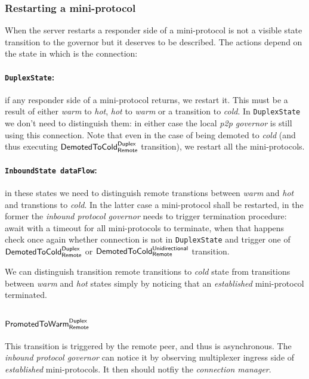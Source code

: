 \documentclass{article}
\def\DuplexState{\texttt{DuplexState}}
\def\InboundStateAny{\texttt{InboundState dataFlow}}
\def\PromotedToWarmDupRem{$\text{\textsf{PromotedToWarm}}^\text{\textsf{Duplex}}_\text{\textsf{Remote}}$}
\def\DemotedToColdDupRem{$\text{\textsf{DemotedToCold}}^\text{\textsf{Duplex}}_\text{\textsf{Remote}}$}
\def\DemotedToColdUniRem{$\text{\textsf{DemotedToCold}}^\text{\textsf{Unidirectional}}_\text{\textsf{Remote}}$}
\def\cold{\textit{cold}}
\def\warm{\textit{warm}}
\def\hot{\textit{hot}}
\def\established{\textit{established}}
\def\ptopgov{\textit{p2p governor}}
\def\inbgov{\textit{inbound protocol governor}}
\begin{document}
\subsubsection{Restarting a mini-protocol}
When the server restarts a responder side of a mini-protocol is not a visible
state transition to the governor but it deserves to be described.  The actions
depend on the state in which is the connection:

\paragraph{\DuplexState{}:}
if any responder side of a mini-protocol returns, we
restart it.  This must be a result of either \warm{} to \hot{}, \hot{} to
\warm{} or a transition to \cold{}.  In \DuplexState{} we don't need to
distinguish them: in either case the local \ptopgov{} is still using this
connection.  Note that even in the case of being demoted to \cold{} (and thus
executing \DemotedToColdDupRem{} transition), we restart all the
mini-protocols.

\paragraph{\InboundStateAny{}:}
in these states we need to distinguish remote transtions between \warm{} and
\hot{} and transtions to \cold{}.  In the latter case a mini-protocol shall be
restarted, in the former the \inbgov{} needs to trigger termination procedure:
await with a timeout for all mini-protocols to terminate, when that happens
check once again whether connection is not in \DuplexState{} and trigger one of
\DemotedToColdDupRem{} or \DemotedToColdUniRem{} transition.

We can distinguish transition remote transitions to \cold{} state from
transitions between \warm{} and \hot{} states simply by noticing that an
\established{} mini-protocol terminated.

\subsection{\PromotedToWarmDupRem{}}
This transition is triggered by the remote peer, and thus is asynchronous.  The
\inbgov{} can notice it by observing multiplexer ingress side of \established{}
mini-protocols.  It then should notfiy the \textit{connection manager}.
\end{document}
